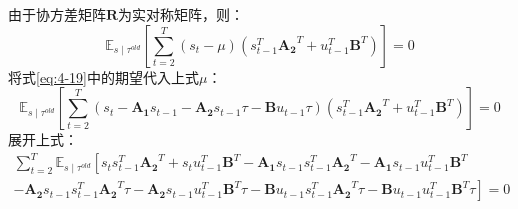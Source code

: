 由于协方差矩阵$\mathbf{R}$为实对称矩阵，则：
\begin{equation}
    \mathbb{E}_{s \mid \tau^{old}}\left[\sum_{t=2}^T \left(s_t-\mu\right)\left(s_{t-1}^T\mathbf{A_2}^T +u_{t-1}^T\mathbf{B}^T \right)\right] = 0
    \label{eq:4-29}
\end{equation}
将式\ref{eq:4-19}中的期望代入上式$\mu$：
\begin{equation}
    \mathbb{E}_{s \mid \tau^{old}}\left[\sum_{t=2}^T \left(s_t-\mathbf{A_1}s_{t-1}-\mathbf{A_2}s_{t-1}\tau-\mathbf{B}u_{t-1}\tau \right)\left(s_{t-1}^T\mathbf{A_2}^T +u_{t-1}^T\mathbf{B}^T \right)\right] = 0
    \label{eq:4-30}
\end{equation}
展开上式：
\begin{equation}
    \begin{gathered}
    \sum_{t=2}^T \mathbb{E}_{s \mid \tau^{old}}\left[s_ts_{t-1}^T\mathbf{A_2}^T + s_tu_{t-1}^T\mathbf{B}^T -\mathbf{A_1}s_{t-1}s_{t-1}^T\mathbf{A_2}^T - \mathbf{A_1}s_{t-1}u_{t-1}^T\mathbf{B}^T \right. \\ 
    \left. - \mathbf{A_2}s_{t-1}s_{t-1}^T\mathbf{A_2}^T\tau -\mathbf{A_2}s_{t-1}u_{t-1}^T\mathbf{B}^T\tau - \mathbf{B}u_{t-1}s_{t-1}^T\mathbf{A_2}^T\tau - \mathbf{B}u_{t-1}u_{t-1}^T\mathbf{B}^T\tau\right] = 0
    \end{gathered}
    \label{eq:4-31}
\end{equation}

